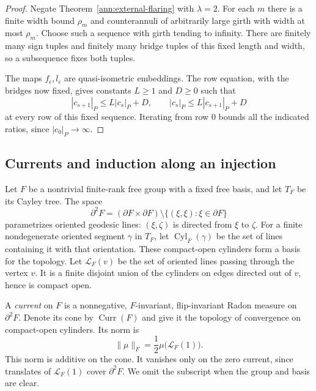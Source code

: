 \begin{proof}
Negate Theorem~\ref{ann:external-flaring} with $\lambda=2$.  For each
$m$ there is a finite width bound $\rho_m$ and counterannuli of
arbitrarily large girth with width at most $\rho_m$.  Choose such a
sequence with girth tending to infinity.  There are finitely many sign
tuples and finitely many bridge tuples of this fixed length and width,
so a subsequence fixes both tuples.

The maps $f_\epsilon,l_\epsilon$ are quasi-isometric embeddings.  The
row equation, with the bridges now fixed, gives constants $L\geq1$ and
$D\geq0$ such that
\[
 |c_{s+1}|_P\leq L|c_s|_P+D,
 \qquad |c_s|_P\leq L|c_{s+1}|_P+D
\]
at every row of this fixed sequence.  Iterating from row $0$ bounds all
the indicated ratios, since $|c_0|_P\to\infty$.
\end{proof}

\subsection{Currents and induction along an injection}

Let $F$ be a nontrivial finite-rank free group with a fixed free basis,
and let $T_F$ be its Cayley tree.  The space
\[
 \partial^2F=(\partial F\times\partial F)\setminus\{(\xi,\xi):
 \xi\in\partial F\}
\]
parametrizes oriented geodesic lines: $(\xi,\zeta)$ is directed from
$\xi$ to $\zeta$.  For a finite nondegenerate oriented segment $\gamma$
in $T_F$, let $\operatorname{Cyl}_F(\gamma)$ be the set of lines
containing it with that orientation.  These compact-open cylinders
form a basis for the topology.  Let $\mathcal L_F(v)$ be the set of
oriented lines passing through the vertex $v$.  It is a finite disjoint
union of the cylinders on edges directed out of $v$, hence is compact
open.

A \emph{current} on $F$ is a nonnegative, $F$-invariant, flip-invariant
Radon measure on $\partial^2F$.  Denote its cone by
$\operatorname{Curr}(F)$ and give it the topology of convergence on
compact-open cylinders.  Its norm is
\begin{equation}
 \|\mu\|_F=\frac12\mu\bigl(\mathcal L_F(1)\bigr).
 \label{ann:current-norm}
\end{equation}
This norm is additive on the cone.  It vanishes only on the zero
current, since translates of $\mathcal L_F(1)$ cover $\partial^2F$.
We omit the subscript when the group and basis are clear.

